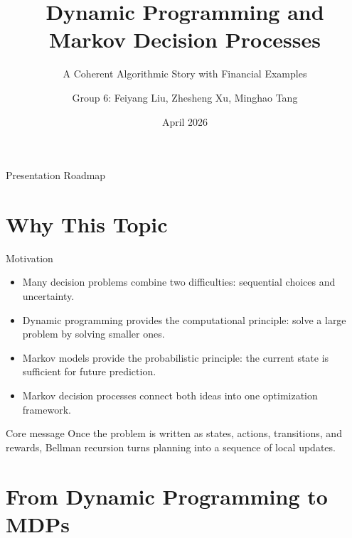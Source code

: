 \documentclass[aspectratio=169,11pt]{beamer}
\title{Dynamic Programming and Markov Decision Processes}
\subtitle{A Coherent Algorithmic Story with Financial Examples}
\author{Group 6: Feiyang Liu, Zhesheng Xu, Minghao Tang}
\date{April 2026}
\institute{Algorithm Analysis Presentation}
\begin{document}
\begin{frame}
  \titlepage
\end{frame}

\begin{frame}{Presentation Roadmap}
  \tableofcontents
\end{frame}

\section{Why This Topic}

\begin{frame}{Motivation}
  \begin{itemize}
    \item Many decision problems combine two difficulties: sequential choices and uncertainty.
    \item Dynamic programming provides the computational principle: solve a large problem by solving smaller ones.
    \item Markov models provide the probabilistic principle: the current state is sufficient for future prediction.
    \item Markov decision processes connect both ideas into one optimization framework.
  \end{itemize}

  \vspace{0.4cm}
  \begin{block}{Core message}
    Once the problem is written as states, actions, transitions, and rewards, Bellman recursion turns planning into a sequence of local updates.
  \end{block}
\end{frame}

\section{From Dynamic Programming to MDPs}
\end{document}
